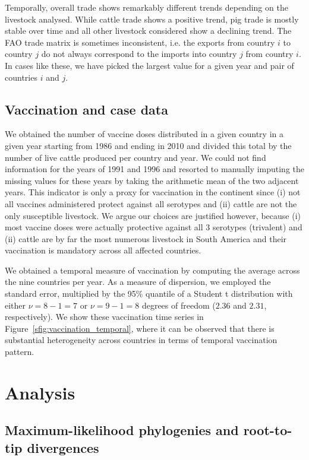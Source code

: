 \documentclass[a4paper,10pt]{article}
\begin{document}
Temporally, overall trade shows remarkably different trends depending on the livestock analysed.
While cattle trade shows a positive trend, pig trade is mostly stable over time and all other livestock considered show a declining trend.
The FAO trade matrix is sometimes inconsistent, i.e. the exports from country $i$ to country $j$ do not always correspond to the imports into country $j$ from country $i$.
In cases like these, we have picked the largest value for a given year and pair of countries $i$ and $j$.

\subsection*{Vaccination and case data}

We obtained the number of vaccine doses distributed in a given country in a given year starting from 1986 and ending in 2010 and divided this total by the number of live cattle produced per country and year.
We could not find information for the years of 1991 and 1996 and resorted to manually imputing the missing values for these years by taking the arithmetic mean of the two adjacent years.
This indicator is only a proxy for vaccination in the continent since (i) not all vaccines administered protect against all serotypes and (ii) cattle are not the only susceptible livestock.
We argue our choices are justified however, because (i) most vaccine doses were actually protective against all 3 serotypes (trivalent) and (ii) cattle are by far the most numerous livestock in South America and their vaccination is mandatory across all affected countries.

We obtained a temporal measure of vaccination by computing the average across the nine countries per year.
As a measure of dispersion, we employed the standard error, multiplied by the 95\% quantile of a Student t distribution with either $\nu = 8 -1 = 7$ or $\nu = 9-1 = 8$ degrees of freedom ($2.36$ and $2.31$, respectively).
We show these vaccination time series in Figure~\ref{sfig:vaccination_temporal}, where it can be observed that there is substantial heterogeneity across countries in terms of temporal vaccination pattern.

\section*{Analysis}

\subsection*{Maximum-likelihood phylogenies and root-to-tip divergences}
\end{document}
